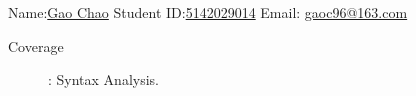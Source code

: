 \documentclass[12pt,a4paper]{article}
\begin{document}
\noindent

\noindent{}
\begin{center}
\footnotesize{\color{blue} \quad Name:\underline{Gao Chao}  \quad Student ID:\underline {5142029014} \quad Email: \underline {gaoc96@163.com}}
\end{center}

\begin{description}
	\item[Coverage]: Syntax Analysis.
\end{description}
\end{document}
